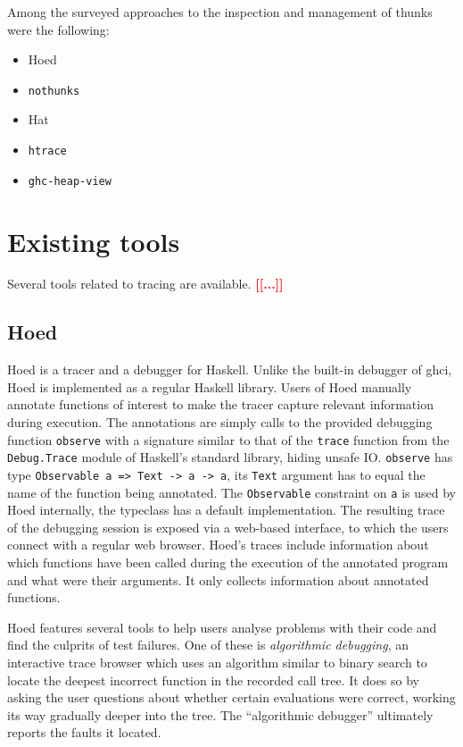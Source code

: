 \documentclass[thesis=B,english]{FITthesis}[2019/12/23]
\newcommand{\todo}[1]{\textcolor{red}{\textbf{[[#1]]}}}
\newcommand{\hackage}[1]{\texttt{#1}}
\newcommand{\hsSignature}[1]{\texttt{#1}}
\newcommand{\hsType}[1]{\texttt{#1}}
\newcommand{\hsIdent}[1]{\texttt{#1}}
\newcommand{\hsModule}[1]{\texttt{#1}}
\begin{document}
Among the surveyed approaches to the inspection and management of thunks were
the following:
\begin{itemize}
	\item Hoed
	\item \hackage{nothunks}
	\item Hat
	\item \hackage{htrace}
	\item \hackage{ghc-heap-view}
\end{itemize}

\section{Existing tools} \label{sec:existing-tools}
Several tools related to tracing are available.
\todo{...}

\subsection*{Hoed} \label{sec:hoed}
Hoed\cite{gh-hoed} is a tracer and a debugger for Haskell. Unlike the built-in
debugger of \acrshort{ghci}, Hoed is implemented as a regular Haskell library.
Users of Hoed manually annotate functions of interest to make the tracer
capture relevant information during execution. The annotations are simply calls
to the provided debugging function \hsIdent{observe} with a signature similar
to that of the \hsIdent{trace} function from the \hsModule{Debug.Trace} module
of Haskell's standard library, hiding unsafe IO. \hsIdent{observe} has type
\hsSignature{Observable a => Text -> a -> a}, its \hsType{Text} argument has to
equal the name of the function being annotated. The \hsType{Observable}
constraint on \hsType{a} is used by Hoed internally, the typeclass has a
default implementation. The resulting trace of the debugging session is exposed
via a web-based interface, to which the users connect with a regular web
browser. Hoed's traces include information about which functions have been
called during the execution of the annotated program and what were their
arguments. It only collects information about annotated functions.

Hoed features several tools to help users analyse problems with their code and
find the culprits of test failures. One of these is \textit{algorithmic
debugging}, an interactive trace browser which uses an algorithm similar to
binary search to locate the deepest incorrect function in the recorded call
tree. It does so by asking the user questions about whether certain evaluations
were correct, working its way gradually deeper into the tree. The ``algorithmic
debugger'' ultimately reports the faults it located.
\end{document}
